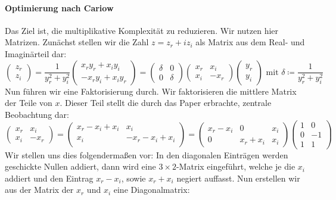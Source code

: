 \documentclass[10pt,fleqn]{article}
\theoremstyle{definition}
\theoremstyle{remark}
\begin{document}
\paragraph{Optimierung nach Cariow} Das Ziel ist, die multiplikative Komplexität zu reduzieren. Wir nutzen hier Matrizen. Zunächst stellen wir die Zahl \(z = z_r + i z_i\) als Matrix aus dem Real- und Imaginärteil dar:
\[
    \begin{pmatrix}
        z_r\\
        z_i
    \end{pmatrix} = \frac{1}{y_r^2+y_i^2} \begin{pmatrix}
        x_ry_r+x_iy_i\\
        -x_ry_i+x_iy_r
    \end{pmatrix} = \begin{pmatrix}
        \delta & 0\\
        0 & \delta
    \end{pmatrix} \begin{pmatrix}
        x_r & x_i\\
        x_i & -x_r
    \end{pmatrix} \begin{pmatrix}
        y_r\\
        y_i
    \end{pmatrix} \text{ mit } \delta \coloneqq \frac{1}{y_r^2+y_i^2}
\]
Nun führen wir eine Faktorisierung durch. Wir faktorisieren die mittlere Matrix der Teile von \(x\). Dieser Teil stellt die durch das Paper erbrachte, zentrale Beobachtung dar:
\[
    \begin{pmatrix}
        x_r & x_i\\
        x_i & -x_r
    \end{pmatrix} = \begin{pmatrix}
        x_r - x_i + x_i & x_i\\
        x_i & -x_r - x_i + x_i\\
    \end{pmatrix} = \begin{pmatrix}
        x_r - x_i & 0 & x_i\\
        0 & x_r + x_i & x_i
    \end{pmatrix} \begin{pmatrix}
        1 & 0\\
        0 & -1\\
        1 & 1
    \end{pmatrix}
\]
Wir stellen uns dies folgendermaßen vor: In den diagonalen Einträgen werden geschickte Nullen addiert, dann wird eine \(3 \times 2\)-Matrix eingeführt, welche je die \(x_i\) addiert und den Eintrag \(x_r-x_i\), sowie \(x_r+x_i\) negiert auffasst. Nun erstellen wir aus der Matrix der \(x_r\) und \(x_i\) eine Diagonalmatrix:
\end{document}
